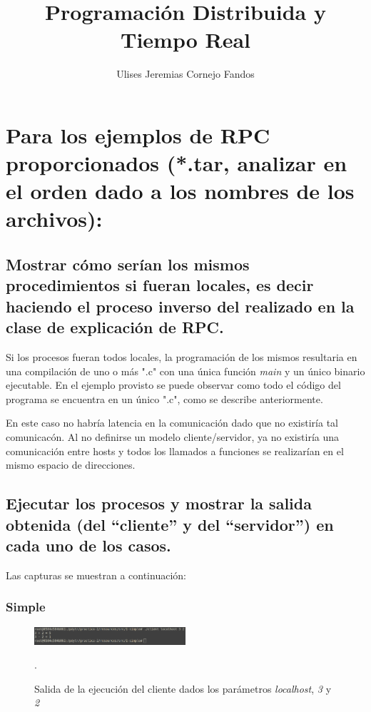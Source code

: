 \documentclass[osajnl,twocolumn,showpacs,superscriptaddress,10pt]{revtex4-1} %
\begin{document}
\title{Programación Distribuida y Tiempo Real}

\author{Ulises Jeremias Cornejo Fandos}

\maketitle %

\section{Para los ejemplos de RPC proporcionados (*.tar, analizar en el orden dado a los nombres de
los archivos):}

\subsection{Mostrar cómo serían los mismos procedimientos si fueran locales, es decir haciendo el
proceso inverso del realizado en la clase de explicación de RPC.}

Si los procesos fueran todos locales, la programación de los mismos resultaria en una compilación de uno o más ".c" con una única función \textit{main} y un único binario ejecutable. En el ejemplo provisto se puede observar como todo el código del programa se encuentra en un único ".c", como se describe anteriormente.

En este caso no habría latencia en la comunicación dado que no existiría tal comunicacón. Al no definirse un modelo cliente/servidor, ya no existiría una comunicación entre hosts y todos los llamados a funciones se realizarían en el mismo espacio de direcciones.

\subsection{Ejecutar los procesos y mostrar la salida obtenida (del “cliente” y del “servidor”) en cada
uno de los casos.}

Las capturas se muestran a continuación:

\subsubsection{Simple}

\begin{figure}[H]
    \centering
    \includegraphics[width=0.5\textwidth]{capturas/1-simple-client}
    \caption{Salida de la ejecución del cliente dados los parámetros \textit{localhost}, \textit{3} y \textit{2}}.
    \label{figure:1-simple-client}
\end{figure}
\end{document}
